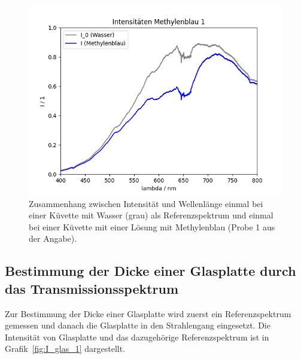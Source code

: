 \documentclass{article}
\begin{document}
\begin{figure}[H]
\centering
\caption{Zusammenhang zwischen Intensität und Wellenlänge einmal bei einer Küvette mit Wasser (grau) als Referenzspektrum und einmal bei einer Küvette mit einer Lösung mit Methylenblau (Probe 1 aus der Angabe).}
\label{fig:I_methylenblau1}
\includegraphics[scale=0.6]{MB_Intensitaeten_1.png}
\end{figure}






\subsection{Bestimmung der Dicke einer Glasplatte durch das Transmissionsspektrum}

Zur Bestimmung der Dicke einer Glasplatte wird zuerst ein Referenzspektrum gemessen und danach die Glasplatte in den Strahlengang eingesetzt. Die Intensität von Glasplatte und das dazugehörige Referenzspektrum ist in Grafik~\ref{fig:I_glas_1} dargestellt.
\end{document}
